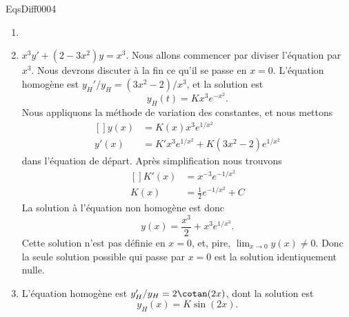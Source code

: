 \begin{corrige}{EqsDiff0004}
\begin{enumerate}
\item
\item
$x^3y'+(2-3x^2)y=x^3$. Nous allons commencer par diviser l'équation par $x^3$. Nous devrons discuter à la fin ce qu'il se passe en $x=0$. L'équation homogène est $y_H'/y_H=(3x^2-2)/x^3$, et la solution est
\begin{equation}
	y_H(t)=Kx^3 e^{-x^2}.
\end{equation}
Nous appliquons la méthode de variation des constantes, et nous mettons
\begin{equation}
	\begin{aligned}[]
		y(x)&=K(x)x^3 e^{1/x^2}\\
		y'(x)&=K'x^3 e^{1/x^2}+K(3x^2-2) e^{1/x^2}
	\end{aligned}
\end{equation}
dans l'équation de départ. Après simplification nous trouvons
\begin{equation}
	\begin{aligned}[]
		K'(x)&=x^{-3} e^{-1/x^2}\\
		K(x)&=\frac{ 1 }{2} e^{-1/x^2}+C
	\end{aligned}
\end{equation}
La solution à l'équation non homogène est donc
\begin{equation}
	y(x)=\frac{ x^3 }{2}+x^3 e^{1/x^3}.
\end{equation}
Cette solution n'est pas définie en $x=0$, et, pire, $\lim_{x\to 0} y(x)\neq 0$. Donc la seule solution possible qui passe par $x=0$ est la solution identiquement nulle.
	
\item
L'équation homogène est $y'_H/y_H=2\cotan(2x)$, dont la solution est
\begin{equation}
	y_H(x)=K\sin(2x).
\end{equation}
\end{enumerate}

\end{corrige}
